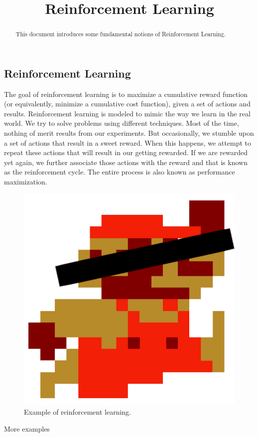 \documentclass{article}
\begin{document}
\title{Reinforcement Learning}

\maketitle

\begin{abstract}
This document introduces some fundamental notions of Reinforcement Learning.
\end{abstract}

\subsection{Reinforcement Learning}
\par The goal of reinforcement learning is to maximize a cumulative reward function (or equivalently, minimize a cumulative cost function), given a set of actions and results. Reinforcement learning is modeled to mimic the way we learn in the real world. We try to solve problems using different techniques. Most of the time, nothing of merit results from our experiments. But occasionally, we stumble upon a set of actions that result in a sweet reward. When this happens, we attempt to repeat these actions that will result in our getting rewarded. If we are rewarded yet again, we further associate those actions with the reward and that is known as the reinforcement cycle. The entire process is also known as performance maximization.

\begin{figure}[H]
\centering
\includegraphics[width=0.6\linewidth]{pic/reinforcement-learning.png}
\caption{Example of reinforcement learning.}
\end{figure}

More examples
\end{document}
